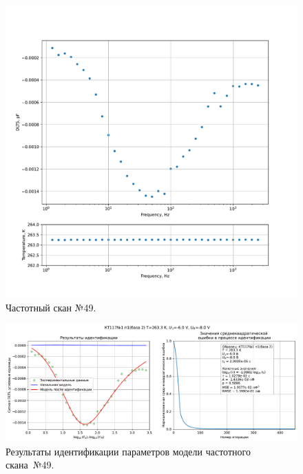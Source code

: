 \begin{figure}[!ht]
    \centering
    \includegraphics[width=1\textwidth]{../plots/КТ117№1_п1(база 2)_2500Гц-1Гц_1пФ_-10С_-6В-8В_50мВ_20мкс_шаг_0,1.pdf}
    \caption{Частотный скан №49.}
    \label{pic:frequency_scan_49}
\end{figure}

\begin{figure}[!ht]
    \centering
    \includegraphics[width=1\textwidth]{../plots/КТ117№1_п1(база 2)_2500Гц-1Гц_1пФ_-10С_-6В-8В_50мВ_20мкс_шаг_0,1_model.pdf}
    \caption{Результаты идентификации параметров модели частотного скана~№49.}
    \label{pic:frequency_scan_model49}
\end{figure}

\pagebreak



